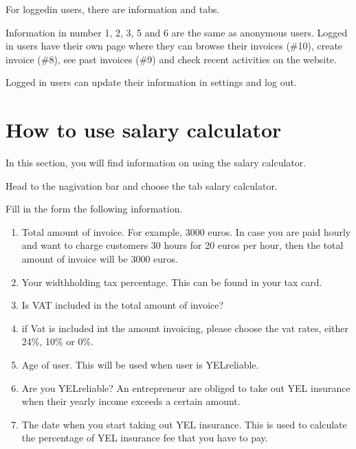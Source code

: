 \documentclass[letterpaper,10pt,english]{sphinxmanual}
\begin{document}
\sphinxAtStartPar
For logged\sphinxhyphen{}in users, there are information and tabs.

\noindent{}

\sphinxAtStartPar
Information in number 1, 2, 3, 5 and 6 are the same as anonymous users. Logged in users have their own page where they can browse their invoices (\#10), create invoice (\#8), see past invoices (\#9) and check recent activities on the website.

\sphinxAtStartPar
Logged in users can update their information in settings and log out.

\noindent{}

\sphinxstepscope


\chapter{How to use salary calculator}
\label{\detokenize{pages/salary-calculator:how-to-use-salary-calculator}}\label{\detokenize{pages/salary-calculator::doc}}
\sphinxAtStartPar
In this section, you will find information on using the salary calculator.

\sphinxAtStartPar
Head to the nagivation bar and choose the tab salary calculator.

\noindent{}

\sphinxAtStartPar
Fill in the form the following information.
\begin{enumerate}
%
\item {} 
\sphinxAtStartPar
Total amount of invoice. For example, 3000 euros. In case you are paid hourly and want to charge customers 30 hours for 20 euros per hour, then the total amount of invoice will be 3000 euros.

\item {} 
\sphinxAtStartPar
Your widthholding tax percentage. This can be found in your tax card.

\item {} 
\sphinxAtStartPar
Is VAT included in the total amount of invoice?

\item {} 
\sphinxAtStartPar
if Vat is included int the amount invoicing, please choose the vat rates, either 24\%, 10\% or 0\%.

\item {} 
\sphinxAtStartPar
Age of user. This will be used when user is YEL\sphinxhyphen{}reliable.

\item {} 
\sphinxAtStartPar
Are you YEL\sphinxhyphen{}reliable? An entrepreneur are obliged to take out YEL insurance when their yearly income exceeds a certain amount.

\item {} 
\sphinxAtStartPar
The date when you start taking out YEL insurance. This is used to calculate the percentage of YEL insurance fee that you have to pay.

\end{enumerate}
\end{document}
